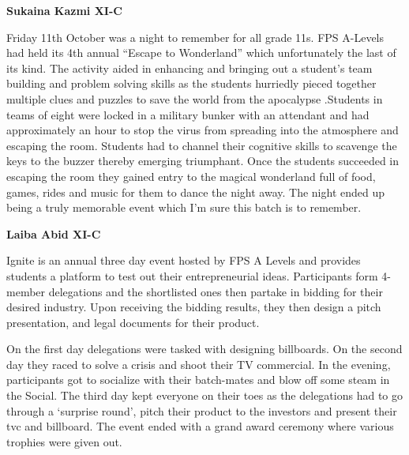 \documentclass{article}
\begin{document}
\begin{multicols}{2}

\textbf{Sukaina Kazmi XI-C}

Friday 11th October was a night to remember for all grade 11s. FPS A-Levels had held its 4th annual “Escape to Wonderland” which unfortunately the last of its kind. The activity aided in enhancing and bringing out a student’s team building and problem solving skills as the students hurriedly pieced together multiple clues and puzzles to save the world from the apocalypse .Students in teams of eight were locked in a military bunker with an attendant and had approximately an hour to stop the virus from spreading into the atmosphere and escaping the room. Students had to channel their cognitive skills to scavenge the keys to the buzzer thereby emerging triumphant. Once the students succeeded in escaping the room they gained entry to the magical wonderland full of food, games, rides and music for them to dance the night away. The night ended up being a truly memorable event which I’m sure this batch is to remember.


\textbf{Laiba Abid XI-C}

Ignite is an annual three day event hosted by FPS A Levels and provides students a platform to test out their entrepreneurial ideas. Participants form 4-member delegations and the shortlisted ones then partake in bidding for their desired industry. Upon receiving the bidding results, they then design a pitch presentation, and legal documents for their product. 

On the first day delegations were tasked with designing billboards. On the second day they raced to solve a crisis and shoot their TV commercial. In the evening, participants got to socialize with their batch-mates and blow off some steam in the Social. The third day kept everyone on their toes as the delegations had to go through a ‘surprise round’, pitch their product to the investors and present their tvc and billboard. The event ended with a grand award ceremony where various trophies were given out.

\end{multicols}
\pagebreak 
\end{document}
